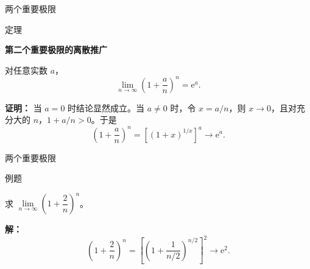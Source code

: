 \documentclass[aspectratio=169,10pt,fontset=fandol]{ctexbeamer}
\newcommand{\ee}{\mathrm{e}}
\begin{document}
\begin{frame}[t,fragile]{两个重要极限}
\normalsize
\begin{block}{定理}
{\normalsize
\textbf{第二个重要极限的离散推广}\par

对任意实数 \(a\)，
\[
\lim_{n\to\infty}\left(1+\frac an\right)^n=\ee^a.
\]

}
\end{block}
\pause
{\normalsize
\textbf{证明：}
当 \(a=0\) 时结论显然成立。当 \(a\neq0\) 时，令 \(x=a/n\)，则 \(x\to0\)，且对充分大的 \(n\)，\(1+a/n>0\)。于是
\[
\left(1+\frac an\right)^n
=\left[(1+x)^{1/x}\right]^a\longrightarrow\ee^a.
\]

}
\end{frame}
\begin{frame}[t,fragile]{两个重要极限}
\normalsize
\begin{block}{例题}
{\normalsize
求 \(\lim\limits_{n\to\infty} \left(1 + \dfrac{2}{n}\right)^n\)。

}
\end{block}
\pause
{\normalsize
\textbf{解：}
\[
	\left(1 + \dfrac{2}{n}\right)^n = \left[\left(1 + \dfrac{1}{n/2}\right)^{n/2}\right]^2 \to \ee^2.
	\]

}
\end{frame}
\end{document}
